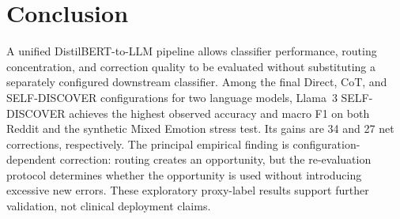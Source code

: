 \documentclass{ieeeaccess}
\begin{document}
\section{Conclusion}
A unified DistilBERT-to-LLM pipeline allows classifier performance, routing concentration, and correction quality to be evaluated without substituting a separately configured downstream classifier. Among the final Direct, CoT, and SELF-DISCOVER configurations for two language models, Llama~3 SELF-DISCOVER achieves the highest observed accuracy and macro F1 on both Reddit and the synthetic Mixed Emotion stress test. Its gains are 34 and 27 net corrections, respectively. The principal empirical finding is configuration-dependent correction: routing creates an opportunity, but the re-evaluation protocol determines whether the opportunity is used without introducing excessive new errors. These exploratory proxy-label results support further validation, not clinical deployment claims.
\end{document}
